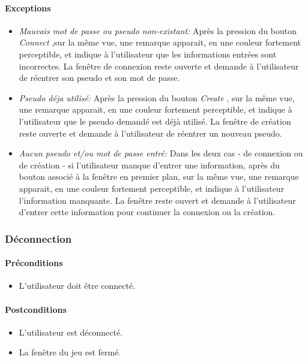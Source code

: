 \documentclass[a4paper,11pt]{report}
\begin{document}
\paragraph{Exceptions}
\begin{itemize}
 \item \textit{Mauvais mot de passe ou pseudo non-existant:} Après la pression du bouton \og \textit{Connect} \fg
 ,sur la même vue, une remarque apparait, en une couleur fortement
 perceptible, et indique à l'utilisateur que les informations entrées sont incorrectes. La fenêtre de connexion reste ouverte et
 demande à l'utilisateur de réentrer son pseudo et son mot de passe.
 \item \textit{Pseudo déja utilisé:} Après la pression du bouton \og \textit{Create} \fg,
 sur la même vue, une remarque apparait, en une couleur fortement
 perceptible, et indique à l'utilisateur que le pseudo demandé est déjà utilisé. La fenêtre de création reste ouverte
 et demande à l'utilisateur de réentrer un nouveau pseudo.
 \item \textit{Aucun pseudo et/ou mot de passe entré:} Dans les deux cas - de connexion ou de création - si l'utilisateur
 manque d'entrer une information, après du bouton associé à la fenêtre en premier plan, sur la même vue,
 une remarque apparait, en une couleur fortement perceptible, et indique à l'utilisateur l'information manquante. La
 fenêtre reste ouvert et demande à l'utilisateur d'entrer cette information pour continuer la connexion ou la création.
\end{itemize}

\subsubsection{Déconnection}
\paragraph{Préconditions}
\begin{itemize}
 \item L'utilisateur doit être connecté.
\end{itemize}
\paragraph{Postconditions}
\begin{itemize}
 \item L'utilisateur est déconnecté.
 \item La fenêtre du jeu est fermé.
\end{itemize}
\end{document}
